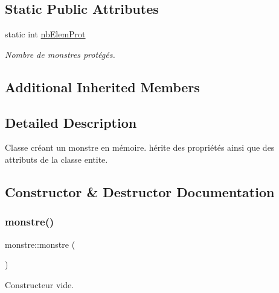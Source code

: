 \subsection*{Static Public Attributes}
\begin{DoxyCompactItemize}
\item 
static int \hyperlink{classmonstre_a9de7f320e15973eca48ff44d7e94ae04}{nb\+Elem\+Prot}
\begin{DoxyCompactList}\small\item\em Nombre de monstres protégés. \end{DoxyCompactList}\end{DoxyCompactItemize}
\subsection*{Additional Inherited Members}


\subsection{Detailed Description}
Classe créant un monstre en mémoire. hérite des propriétés ainsi que des attributs de la classe entite. 

\subsection{Constructor \& Destructor Documentation}
\mbox{\label{classmonstre_a718cb1c5f9297f00e42e6b884ca85d6d}} 
\subsubsection{\texorpdfstring{monstre()}{monstre()}\hspace{0.1cm}{\footnotesize\ttfamily [1/2]}}
{\footnotesize\ttfamily monstre\+::monstre (\begin{DoxyParamCaption}{ }\end{DoxyParamCaption})}



Constructeur vide. 


